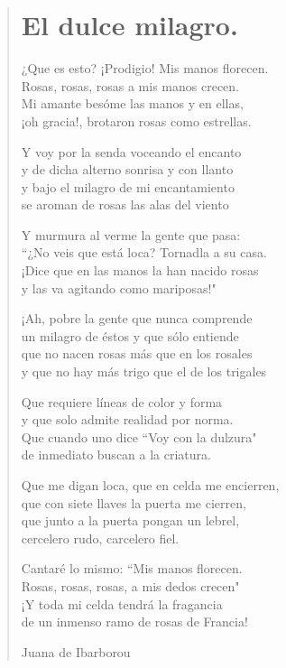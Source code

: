 \documentclass[12pt, twoside]{book}
\begin{document}
\begin{verse}
\begin{center}
\section{El dulce milagro.}
\end{center}
¿Que es esto? ¡Prodigio! Mis manos florecen.\\
Rosas, rosas, rosas a mis manos crecen.\\
Mi amante besóme las manos y en ellas,\\
¡oh gracia!, brotaron rosas como estrellas.\newline

Y voy por la senda voceando el encanto\\
y de dicha alterno sonrisa y con llanto\\
y bajo el milagro de mi encantamiento\\
se aroman de rosas las alas del viento\newline

Y murmura al verme la gente que pasa:\\
``¿No veis que está loca? Tornadla a su casa.\\
¡Dice que en las manos la han nacido rosas\\
y las va agitando como mariposas!"\newline

¡Ah, pobre la gente que nunca comprende\\
un milagro de éstos y que sólo entiende\\
que no nacen rosas más que en los rosales\\
y que no hay más trigo que el de los trigales\newline

Que requiere líneas de color y forma\\
y que solo admite realidad por norma.\\
Que cuando uno dice ``Voy con la dulzura"\\
de inmediato buscan a la criatura.\newpage

Que me digan loca, que en celda me encierren,\\
que con siete llaves la puerta me cierren,\\
que junto a la puerta pongan un lebrel,\\
cercelero rudo, carcelero fiel.\newline

Cantaré lo mismo: ``Mis manos florecen.\\
Rosas, rosas, rosas, a mis dedos crecen"\\
¡Y toda mi celda tendrá la fragancia\\
de un inmenso ramo de rosas de Francia!\newline

Juana de Ibarborou
\end{verse}
\newpage
\end{document}
